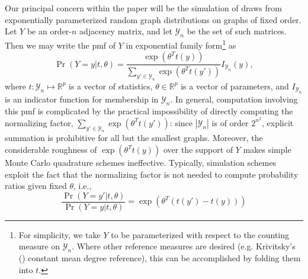 \documentclass[11pt]{article}
\begin{document}
Our principal concern within the paper will be the simulation of draws from exponentially parameterized random graph distributions on graphs of fixed order.  Let $Y$ be an order-$n$ adjacency matrix, and let $\mathcal{Y}_n$ be the set of such matrices.  Then we may write the pmf of $Y$ in exponential family form\footnote{For simplicity, we take $Y$ to be parameterized with respect to the counting measure on $\mathcal{Y}_n$.  Where other reference measures are desired (e.g. Krivitsky's (\citeyear{krivitsky.et.al:statm:2011}) constant mean degree reference), this can be accomplished by folding them into $t$.} as
\begin{equation}
\Pr\left(Y=y\left|t,\theta\right.\right) = \frac{\exp\left(\theta^T t\left(y\right)\right)}{\sum_{y' \in \mathcal{Y}_n} \exp\left(\theta^T t\left(y'\right)\right)} I_{\mathcal{Y}_n}(y), \label{eq_erg}
\end{equation}
where $t: \mathcal{Y}_n \mapsto \mathbb{R}^p$ is a vector of statistics, $\theta \in \mathbb{R}^p$ is a vector of parameters, and $I_{\mathcal{Y}_n}$ is an indicator function for membership in $\mathcal{Y}_n$.  In general, computation involving this pmf is complicated by the practical impossibility of directly computing the normalizing factor, $\sum_{y' \in \mathcal{Y}_n} \exp\left(\theta^T t\left(y'\right)\right)$: since $|\mathcal{Y}_n|$ is of order $2^{n^2}$, explicit summation is prohibitive for all but the smallest graphs.  Moreover, the considerable roughness of $\exp\left(\theta^T t\left(y\right)\right)$ over the support of $Y$ makes simple Monte Carlo quadrature schemes ineffective.  Typically, simulation schemes exploit the fact that the normalizing factor is not needed to compute probability ratios given fixed $\theta$, i.e.,
\begin{equation}
\frac{\Pr\left(Y=y'\left|t,\theta\right.\right)}{\Pr\left(Y=y\left|t,\theta\right.\right)} = \exp\left(\theta^T\left(t\left(y'\right)-t\left(y\right)\right)\right) \label{eq_prat}
\end{equation}
\end{document}
